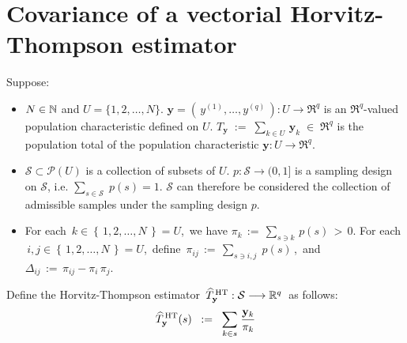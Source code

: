 

\section{Covariance of a vectorial Horvitz-Thompson estimator}
\setcounter{theorem}{0}
\setcounter{equation}{0}


\renewcommand{\theenumi}{\roman{enumi}}
\renewcommand{\labelenumi}{\textnormal{(\theenumi)}$\;\;$}


\begin{proposition}
\mbox{}
\vskip 0.15cm
\noindent
Suppose:
\begin{itemize}
\item
	$N \in \N$ and $U = \{1,2,\ldots,N\}$.
	\vskip 0.05cm
	$\mathbf{y} = \left(\,y^{(1)},\ldots,y^{(q)}\,\right) : U \longrightarrow \Re^{q}$
	is an $\Re^{q}$-valued population characteristic defined on $U$.
	\vskip 0.05cm
	$T_{\mathbf{y}} \; := \; \underset{k \in U}{\sum}\,\mathbf{y}_{k} \; \in \; \Re^{q}$ is the population total
	of the population characteristic $\mathbf{y} : U \longrightarrow \Re^{q}$.
\item
	$\mathcal{S} \subset \mathcal{P}(U)$ is a collection of subsets of $U$.
	$p : \mathcal{S} \longrightarrow (0,1]$ is a sampling design on $\mathcal{S}$,
	i.e. $\underset{s\in\mathcal{S}}{\sum}\;p(s) = 1$.
	\vskip 0.05cm
	$\mathcal{S}$ can therefore be considered the collection of admissible samples under the sampling design $p$.
\item
	For each \,$k \in \left\{\,1,2,\ldots,N\,\right\} = U$,\, we have
	$\pi_{k} \,:=\, \underset{s \ni k}{\sum}\,p(s) \,>\, 0$.
	\vskip 0.05cm
	For each \,$i,j \in \left\{\,1,2,\ldots,N\,\right\} = U$,\, define
	\,$\pi_{ij} \, := \, \underset{s \ni i,j}{\sum}\;p(s)$\,,\, and
	\,$\Delta_{ij} \, := \, \pi_{ij} - \pi_{i}\,\pi_{j}$.
\end{itemize}
Define the Horvitz-Thompson estimator
\,$\widehat{T}^{\,\textnormal{HT}}_{\mathbf{y}} : \mathcal{S} \longrightarrow \Re^{q}$\,
as follows:
\begin{equation*}
\widehat{T}^{\,\textnormal{HT}}_{\mathbf{y}}(s)
\;\; := \;\;
	\underset{k \in s}{\sum}\;\dfrac{\mathbf{y}_{k}}{\pi_{k}}

\end{equation*}
\end{proposition}
